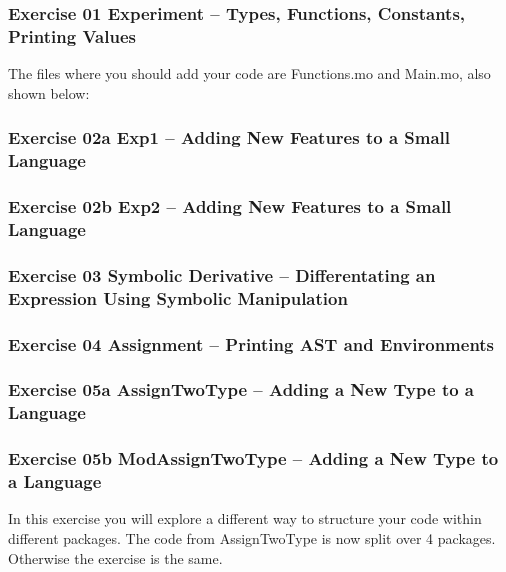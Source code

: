 \documentclass[10pt,a4]{article}
\begin{document}
\subsubsection*{Exercise 01 Experiment – Types, Functions, Constants, Printing Values}
\lstset{language=}

\lstset{language=modelica}

The files where you should add your code are Functions.mo and Main.mo, also shown below:




\subsubsection*{Exercise 02a Exp1 –  Adding New Features to a Small Language}
\lstset{language=}

\lstset{language=modelica}


\subsubsection*{Exercise 02b Exp2 –  Adding New Features to a Small Language}
\lstset{language=}

\lstset{language=modelica}


\subsubsection*{Exercise 03 Symbolic Derivative –  Differentating an Expression Using Symbolic Manipulation}
\lstset{language=}

\lstset{language=modelica}


\subsubsection*{Exercise 04 Assignment – Printing AST and Environments}
\lstset{language=}

\lstset{language=modelica}


\subsubsection*{Exercise 05a AssignTwoType – Adding a New Type to a Language}
\lstset{language=}

\lstset{language=modelica}


\subsubsection*{Exercise 05b ModAssignTwoType – Adding a New Type to a Language}
In this exercise you will explore a different way to structure your code
within different packages. The code from AssignTwoType is now split over 4 packages.
Otherwise the exercise is the same.
\end{document}
